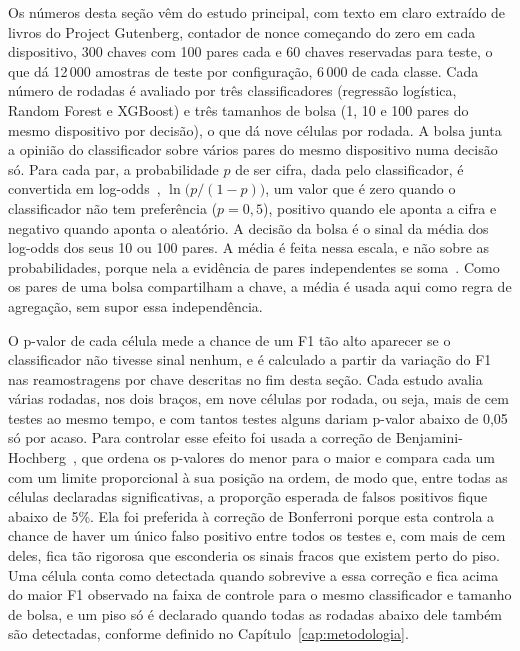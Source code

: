Os números desta seção vêm do estudo principal, com texto em claro extraído de livros do Project Gutenberg, contador de nonce começando do zero em cada dispositivo, 300 chaves com 100 pares cada e 60 chaves reservadas para teste, o que dá 12\,000 amostras de teste por configuração, 6\,000 de cada classe. Cada número de rodadas é avaliado por três classificadores (regressão logística, Random Forest e XGBoost) e três tamanhos de bolsa (1, 10 e 100 pares do mesmo dispositivo por decisão), o que dá nove células por rodada. A bolsa junta a opinião do classificador sobre vários pares do mesmo dispositivo numa decisão só. Para cada par, a probabilidade $p$ de ser cifra, dada pelo classificador, é convertida em log-odds~\cite{Cox1958}, $\ln\big(p/(1-p)\big)$, um valor que é zero quando o classificador não tem preferência ($p = 0{,}5$), positivo quando ele aponta a cifra e negativo quando aponta o aleatório. A decisão da bolsa é o sinal da média dos log-odds dos seus 10 ou 100 pares. A média é feita nessa escala, e não sobre as probabilidades, porque nela a evidência de pares independentes se soma~\cite{Good1950}. Como os pares de uma bolsa compartilham a chave, a média é usada aqui como regra de agregação, sem supor essa independência.

O p-valor de cada célula mede a chance de um F1 tão alto aparecer se o classificador não tivesse sinal nenhum, e é calculado a partir da variação do F1 nas reamostragens por chave descritas no fim desta seção. Cada estudo avalia várias rodadas, nos dois braços, em nove células por rodada, ou seja, mais de cem testes ao mesmo tempo, e com tantos testes alguns dariam p-valor abaixo de 0,05 só por acaso. Para controlar esse efeito foi usada a correção de Benjamini-Hochberg~\cite{Benjamini1995FDR}, que ordena os p-valores do menor para o maior e compara cada um com um limite proporcional à sua posição na ordem, de modo que, entre todas as células declaradas significativas, a proporção esperada de falsos positivos fique abaixo de 5\%. Ela foi preferida à correção de Bonferroni porque esta controla a chance de haver um único falso positivo entre todos os testes e, com mais de cem deles, fica tão rigorosa que esconderia os sinais fracos que existem perto do piso. Uma célula conta como detectada quando sobrevive a essa correção e fica acima do maior F1 observado na faixa de controle para o mesmo classificador e tamanho de bolsa, e um piso só é declarado quando todas as rodadas abaixo dele também são detectadas, conforme definido no Capítulo~\ref{cap:metodologia}.

